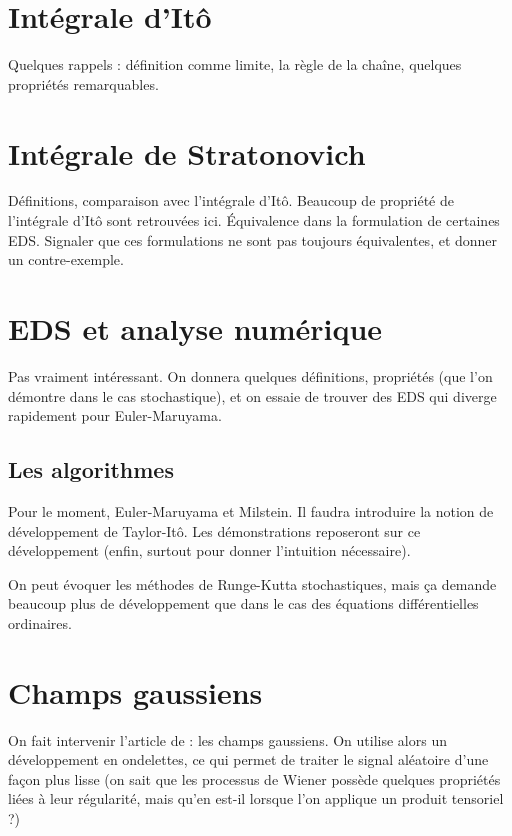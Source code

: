 
\section{Intégrale d'Itô}

Quelques rappels : définition comme limite, la règle de la chaîne,
quelques propriétés remarquables.

\section{Intégrale de Stratonovich}

Définitions, comparaison avec l'intégrale d'Itô. Beaucoup de propriété
de l'intégrale d'Itô sont retrouvées ici. Équivalence dans la
formulation de certaines EDS. Signaler que ces formulations ne sont
pas toujours équivalentes, et donner un contre-exemple.

\section{EDS et analyse numérique}

Pas vraiment intéressant. On donnera quelques définitions, propriétés
(que l'on démontre dans le cas stochastique), et on essaie de trouver
des EDS qui diverge rapidement pour Euler-Maruyama.

\subsection{Les algorithmes}

Pour le moment, Euler-Maruyama et Milstein. Il faudra introduire la
notion de développement de Taylor-Itô. Les démonstrations reposeront
sur ce développement (enfin, surtout pour donner l'intuition
nécessaire).

On peut évoquer les méthodes de Runge-Kutta stochastiques, mais ça
demande beaucoup plus de développement que dans le cas des équations
différentielles ordinaires.

\section{Champs gaussiens}

On fait intervenir l'article de \cite{bierme} : les champs
gaussiens. On utilise alors un développement en ondelettes, ce qui
permet de traiter le signal aléatoire d'une façon plus lisse (on sait
que les processus de Wiener possède quelques propriétés liées à leur
régularité, mais qu'en est-il lorsque l'on applique un produit
tensoriel ?)

